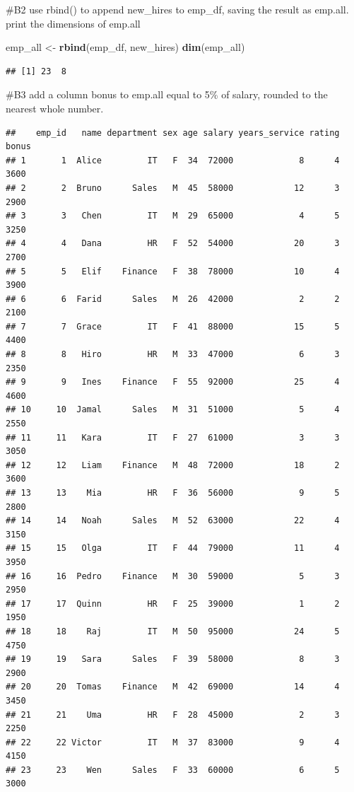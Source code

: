 \documentclass[
]{article}
\newenvironment{Shaded}{\begin{snugshade}}{\end{snugshade}}
\newcommand{\FloatTok}[1]{\textcolor[rgb]{0.00,0.00,0.81}{#1}}
\newcommand{\FunctionTok}[1]{\textcolor[rgb]{0.13,0.29,0.53}{\textbf{#1}}}
\newcommand{\NormalTok}[1]{#1}
\newcommand{\OtherTok}[1]{\textcolor[rgb]{0.56,0.35,0.01}{#1}}
\newcommand{\SpecialCharTok}[1]{\textcolor[rgb]{0.81,0.36,0.00}{\textbf{#1}}}
\begin{document}
\#B2 use rbind() to append new\_hires to emp\_df, saving the result as
emp.all. print the dimensions of emp.all

\begin{Shaded}
\begin{Highlighting}[]
\NormalTok{emp\_all }\OtherTok{\textless{}{-}} \FunctionTok{rbind}\NormalTok{(emp\_df, new\_hires)}
\FunctionTok{dim}\NormalTok{(emp\_all)}
\end{Highlighting}
\end{Shaded}

\begin{verbatim}
## [1] 23  8
\end{verbatim}

\#B3 add a column bonus to emp.all equal to 5\% of salary, rounded to
the nearest whole number.

\begin{Shaded}
\end{Shaded}

\begin{verbatim}
##    emp_id   name department sex age salary years_service rating bonus
## 1       1  Alice         IT   F  34  72000             8      4  3600
## 2       2  Bruno      Sales   M  45  58000            12      3  2900
## 3       3   Chen         IT   M  29  65000             4      5  3250
## 4       4   Dana         HR   F  52  54000            20      3  2700
## 5       5   Elif    Finance   F  38  78000            10      4  3900
## 6       6  Farid      Sales   M  26  42000             2      2  2100
## 7       7  Grace         IT   F  41  88000            15      5  4400
## 8       8   Hiro         HR   M  33  47000             6      3  2350
## 9       9   Ines    Finance   F  55  92000            25      4  4600
## 10     10  Jamal      Sales   M  31  51000             5      4  2550
## 11     11   Kara         IT   F  27  61000             3      3  3050
## 12     12   Liam    Finance   M  48  72000            18      2  3600
## 13     13    Mia         HR   F  36  56000             9      5  2800
## 14     14   Noah      Sales   M  52  63000            22      4  3150
## 15     15   Olga         IT   F  44  79000            11      4  3950
## 16     16  Pedro    Finance   M  30  59000             5      3  2950
## 17     17  Quinn         HR   F  25  39000             1      2  1950
## 18     18    Raj         IT   M  50  95000            24      5  4750
## 19     19   Sara      Sales   F  39  58000             8      3  2900
## 20     20  Tomas    Finance   M  42  69000            14      4  3450
## 21     21    Uma         HR   F  28  45000             2      3  2250
## 22     22 Victor         IT   M  37  83000             9      4  4150
## 23     23    Wen      Sales   F  33  60000             6      5  3000
\end{verbatim}
\end{document}
